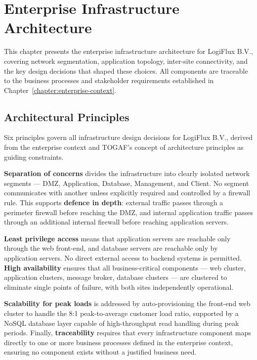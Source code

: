 \chapter{Enterprise Infrastructure Architecture}
\label{chapter:infrastructure}

This chapter presents the enterprise infrastructure architecture for LogiFlux B.V., covering network segmentation, application topology, inter-site connectivity, and the key design decisions that shaped these choices. All components are traceable to the business processes and stakeholder requirements established in Chapter~\ref{chapter:enterprise-context}.

\section{Architectural Principles}

Six principles govern all infrastructure design decisions for LogiFlux B.V., derived from the enterprise context and TOGAF's concept of architecture principles as guiding constraints.

\textbf{Separation of concerns} divides the infrastructure into clearly isolated network segments --- DMZ, Application, Database, Management, and Client. No segment communicates with another unless explicitly required and controlled by a firewall rule. This supports \textbf{defence in depth}: external traffic passes through a perimeter firewall before reaching the DMZ, and internal application traffic passes through an additional internal firewall before reaching application servers.

\textbf{Least privilege access} means that application servers are reachable only through the web front-end, and database servers are reachable only by application servers. No direct external access to backend systems is permitted. \textbf{High availability} ensures that all business-critical components --- web cluster, application clusters, message broker, database clusters --- are clustered to eliminate single points of failure, with both sites independently operational.

\textbf{Scalability for peak loads} is addressed by auto-provisioning the front-end web cluster to handle the 8:1 peak-to-average customer load ratio, supported by a NoSQL database layer capable of high-throughput read handling during peak periods. Finally, \textbf{traceability} requires that every infrastructure component maps directly to one or more business processes defined in the enterprise context, ensuring no component exists without a justified business need.

